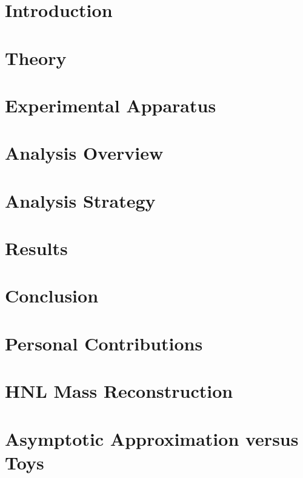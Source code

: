 \documentclass{brandeis-dissertation3.14}
\begin{document}
\chapter*{Introduction}
\label{chap:intro}



\chapter{Theory}
\label{chap:theory}


\chapter{Experimental Apparatus}
\label{chap:experiment}


\chapter{Analysis Overview}
\label{chap:ana_overview}


\chapter{Analysis Strategy}
\label{chap:ana_strategy}


\chapter{Results}
\label{chap:results}


\chapter{Conclusion}
\label{chap:conclusion}


\renewcommand{\bibname}{References}
\singlespacing
\printbibliography

\doublespacing
\renewcommand{\thechapter}{\Alph{chapter}}
\renewcommand{\chaptertitlename}{Appendix}
\setcounter{chapter}{0}

\chapter{Personal Contributions}
\label{chap:pers_contri}


\chapter{HNL Mass Reconstruction}
\label{chap:HNL_mass}


\chapter{Asymptotic Approximation versus Toys}
\label{chap:asymp_vs_toys}

\end{document}
